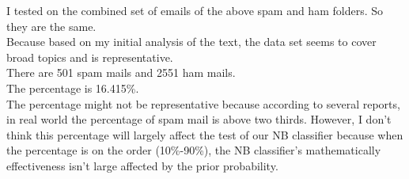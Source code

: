 \documentclass[10pt]{article}
\begin{document}
\noindent I tested on the combined set of emails of the above spam and ham folders. So they are the same.\\

\noindent Because based on my initial analysis of the text, the data set seems to cover broad topics and is representative.\\

\noindent There are 501 spam mails and 2551 ham mails.\\

\noindent The percentage is 16.415\%.\\

\noindent The percentage might not be representative because according to several reports, in real world the percentage of spam mail is above two thirds. However, I don't think this percentage will largely affect the test of our NB classifier because when the percentage is on the order (10\%-90\%), the NB classifier's mathematically effectiveness isn't large affected by the prior probability.
\end{document}
